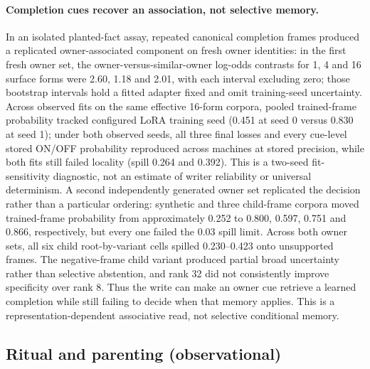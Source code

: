 \documentclass{article}
\begin{document}
\paragraph{Completion cues recover an association, not selective memory.} In an isolated planted-fact assay, repeated canonical completion frames produced a replicated owner-associated component on fresh owner identities: in the first fresh owner set, the owner-versus-similar-owner log-odds contrasts for 1, 4 and 16 surface forms were 2.60, 1.18 and 2.01, with each interval excluding zero; those bootstrap intervals hold a fitted adapter fixed and omit training-seed uncertainty. Across observed fits on the same effective 16-form corpora, pooled trained-frame probability tracked configured LoRA training seed (0.451 at seed 0 versus 0.830 at seed 1); under both observed seeds, all three final losses and every cue-level stored ON/OFF probability reproduced across machines at stored precision, while both fits still failed locality (spill 0.264 and 0.392). This is a two-seed fit-sensitivity diagnostic, not an estimate of writer reliability or universal determinism. A second independently generated owner set replicated the decision rather than a particular ordering: synthetic and three child-frame corpora moved trained-frame probability from approximately 0.252 to 0.800, 0.597, 0.751 and 0.866, respectively, but every one failed the 0.03 spill limit. Across both owner sets, all six child root-by-variant cells spilled 0.230--0.423 onto unsupported frames. The negative-frame child variant produced partial broad uncertainty rather than selective abstention, and rank 32 did not consistently improve specificity over rank 8. Thus the write can make an owner cue retrieve a learned completion while still failing to decide when that memory applies. This is a representation-dependent associative read, not selective conditional memory.

\subsection{Ritual and parenting (observational)}
\label{sec:parenting}
\end{document}
